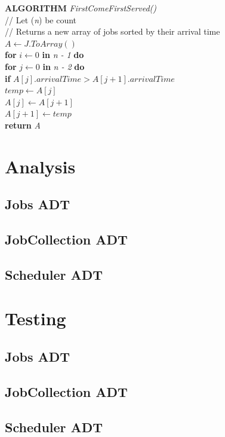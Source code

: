 \documentclass[12pt,a4paper]{article}
\begin{document}
		
			\textbf{ALGORITHM} \textit{FirstComeFirstServed()}\\
			\null\hspace{1cm}// Let (\textit{n}) be count\\
			\null\hspace{1cm}// Returns a new array of jobs sorted by their arrival time\\
			\null\hspace{1cm}\textit{$A \gets J.ToArray()$}\\
			\null\hspace{1cm}\textbf{for} \textit{$i \gets 0$} \textbf{in} \textit{n - 1} \textbf{do}\\
			\null\hspace{2cm}\textbf{for} \textit{$j \gets 0$} \textbf{in} \textit{n - 2} \textbf{do}\\
			\null\hspace{3cm}\textbf{if} \textit{$A[j].arrivalTime > A[j + 1].arrivalTime$}\\
			\null\hspace{4cm}\textit{$temp \gets A[j]$}\\
			\null\hspace{4cm}\textit{$A[j] \gets A[j + 1]$}\\
			\null\hspace{4cm}\textit{$A[j + 1] \gets temp$}\\
			\null\hspace{1cm}\textbf{return} \textit{A}\\
	
	\section{Analysis}
		\subsection{Jobs ADT}
		\subsection{JobCollection ADT}
		\subsection{Scheduler ADT}

	\section{Testing}
		\subsection{Jobs ADT}
		\subsection{JobCollection ADT}
		\subsection{Scheduler ADT}
\end{document}
